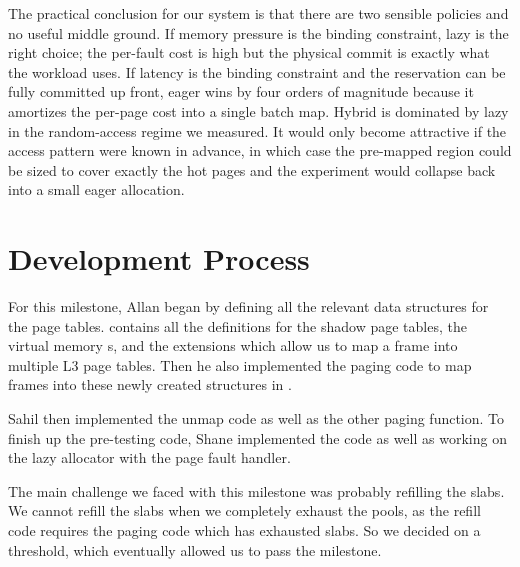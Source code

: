 \medskip\noindent
The practical conclusion for our system is that there are two
sensible policies and no useful middle ground. If memory pressure is
the binding constraint, lazy is the right choice; the per-fault
cost is high but the physical commit is exactly what the workload
uses. If latency is the binding constraint and the reservation can be
fully committed up front, eager wins by four orders of magnitude
because it amortizes the per-page cost into a single batch map.
Hybrid is dominated by lazy in the random-access regime we measured.
It would only become attractive if the access pattern were known in
advance, in which case the pre-mapped region could be sized to cover
exactly the hot pages and the experiment would collapse back into a
small eager allocation.
\newpage
\section{Development Process}
For this milestone, Allan began by defining all the relevant data 
structures for the page tables.  contains
all the definitions for the shadow page tables, the virtual memory s,
and the extensions which allow us to map a frame into multiple L3 page tables.
Then he also implemented the paging code to map frames into these newly created
structures in .

\medskip\noindent
Sahil then implemented the unmap code as well as the other paging function. 
To finish up the pre-testing code, Shane implemented the  code 
as well as working on the lazy allocator with the page fault handler.

\medskip\noindent
The main challenge we faced with this milestone was probably refilling the slabs.
We cannot refill the slabs when we completely exhaust the pools, as the refill
code requires the paging code which has exhausted slabs. So we decided on a 
threshold, which eventually allowed us to pass the milestone.
